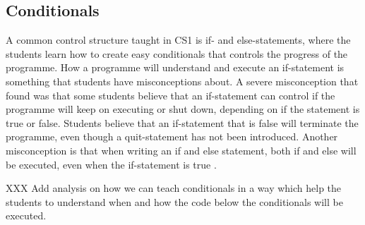\subsection{Conditionals}

A common control structure taught in CS1 is if- and else-statements, where the students learn how to create easy conditionals that controls the progress of the programme. How a programme will understand and execute an if-statement is something that students have misconceptions about. A severe misconception that \textcite{Plass2015Variables} found was that some students believe that an if-statement can control if the programme will keep on executing or shut down, depending on if the statement is true or false. Students believe that an if-statement that is false will terminate the programme, even though a quit-statement has not been introduced. Another misconception is that when writing an if and else statement, both if and else will be executed, even when the if-statement is true \parencite{MisconceptionsSurvey2017}.

XXX Add analysis on how we can teach conditionals in a way which help the students to understand when and how the code below the conditionals will be executed.
